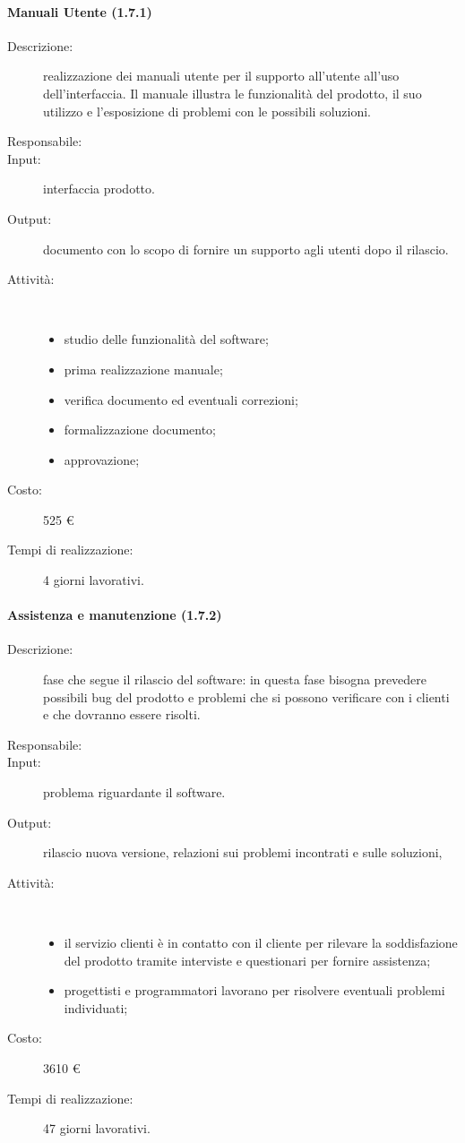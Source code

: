 \begin{description}
\paragraph{Manuali Utente (1.7.1)}
\begin{description}
\item[Descrizione:] realizzazione dei manuali utente per il supporto all'utente all'uso dell'interfaccia. Il manuale illustra le funzionalit\`{a} del prodotto, il suo utilizzo e l'esposizione di problemi con le possibili soluzioni.
\item[Responsabile:] 
\item[Input:] interfaccia prodotto.
\item[Output:] documento con lo scopo di fornire un supporto agli utenti dopo il rilascio.
\item[Attività:]\mbox{}\\[-1.5\baselineskip]
	\begin{itemize}
	\item studio delle funzionalit\`{a} del software;
	\item prima realizzazione manuale;
	\item verifica documento ed eventuali correzioni;
	\item formalizzazione documento;
	\item approvazione;
	\end{itemize}
\item[Costo:] 525 \euro{}
\item[Tempi di realizzazione:] 4 giorni lavorativi.
\end{description}

\paragraph{Assistenza e manutenzione (1.7.2)}
\begin{description}
\item[Descrizione:] fase che segue il rilascio del software: in questa fase bisogna prevedere
possibili bug del prodotto e problemi che si possono verificare con i clienti e che dovranno essere risolti.
\item[Responsabile:] 
\item[Input:] problema riguardante il software.
\item[Output:] rilascio nuova versione, relazioni sui problemi incontrati e sulle soluzioni,
\item[Attività:]\mbox{}\\[-1.5\baselineskip]
	\begin{itemize}
	\item il servizio clienti \`{e} in contatto con il cliente per rilevare la
	soddisfazione del prodotto tramite interviste e questionari per fornire assistenza;
	\item progettisti e programmatori lavorano per risolvere eventuali problemi individuati;
	\end{itemize}
\item[Costo:] 3610 \euro{}
\item[Tempi di realizzazione:] 47 giorni lavorativi.
\end{description}


\end{description}
